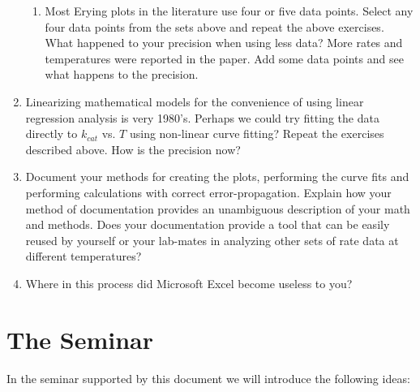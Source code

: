 \documentclass{tufte-handout}
\begin{document}
\begin{enumerate}
\begin{enumerate}
\item Most Erying plots in the literature use four or five data points. Select any four data points from the sets above and repeat the above exercises. What happened to your precision when using less data? More rates and temperatures were reported in the paper. Add some data points and see what happens to the precision.

\end{enumerate}

\item Linearizing mathematical models for the convenience of using linear re\-gres\-sion analysis is very 1980's. Perhaps we could try fitting the data directly to $k_{cat}$ vs. $T$ using non-linear curve fitting? Repeat the exercises described above. How is the precision now?

\item Document your methods for creating the plots, performing the curve fits and performing calculations with correct error-propagation. Explain how your method of documentation provides an unambiguous description of your math and methods. Does your documentation provide a tool that can be easily reused by yourself or your lab-mates in analyzing other sets of rate data at different temperatures?

\item Where in this process did Microsoft Excel become useless to you?

\end{enumerate}

\clearpage
\section{The Seminar}

In the seminar supported by this document we will introduce the following ideas:
\end{document}
